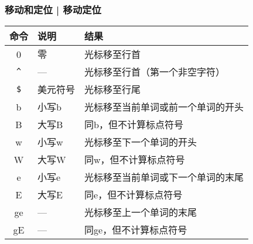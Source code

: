 \begin{frame}[fragile]
  \frametitle{移动和定位 | \alert{移动定位}}
  \begin{table}
    \centering
    \begin{tabularx}{0.9\textwidth}{clX}
      \hline
      \rowcolor{blue!50}命令 & 说明 & 结果\\
      \hline
      0 & 零 & 光标移至行首\\
      \verb|^| & --- & 光标移至行首（第一个非空字符）\\
      \verb|$| & 美元符号 & 光标移至行尾\\
      \hline
      b & 小写b & 光标移至当前单词或前一个单词的开头\\
      B & 大写B & 同b，但不计算标点符号\\
      w & 小写w & 光标移至下一个单词的开头\\
      W & 大写W & 同w，但不计算标点符号\\
      e & 小写e & 光标移至当前单词或下一个单词的末尾\\
      E & 大写E & 同e，但不计算标点符号\\
      ge & --- & 光标移至上一个单词的末尾\\
      gE & --- & 同ge，但不计算标点符号\\
      \hline
    \end{tabularx}
  \end{table}
\end{frame}

